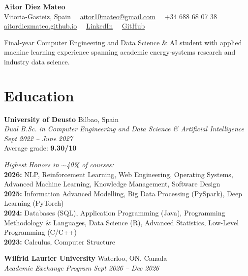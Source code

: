 \documentclass[10pt,a4paper]{article}
\newcommand{\cvheader}[2]{\textbf{#1} \hfill #2\\}
\newcommand{\cvsubheader}[2]{\textit{#1} \hfill \textit{#2}\\[-10pt]}
\begin{document}
\begin{center}
{\Huge \textbf{Aitor Diez Mateo}}\\[5pt]
{\small Vitoria-Gasteiz, Spain \ \textbullet\ \href{mailto:aitor10mateo@gmail.com}{aitor10mateo@gmail.com} \ \textbullet\ +34 688 68 07 38}\\[2pt]
{\small 
\href{https://aitordiezmateo.github.io}{aitordiezmateo.github.io} \ 
\textbullet\ \href{https://www.linkedin.com/in/aitordiezmateo}{LinkedIn} \ \textbullet\ \href{https://github.com/aitorDiezMateo}{GitHub}
}
\end{center}

\vspace{3pt}

\noindent Final-year Computer Engineering and Data Science \& AI student with applied machine learning experience spanning academic energy-systems research and industry data science.

\section{Education}

\cvheader{University of Deusto}{Bilbao, Spain}
\textit{Dual B.Sc. in Computer Engineering and Data Science \& Artificial Intelligence} \hfill \textit{Sept 2022 -- June 2027}\\[4pt] 
\noindent Average grade: \textbf{9.30/10}

\vspace{3pt}
\textit{Highest Honors in $\sim$40\% of courses:}\\[1pt]
\textbf{2026:} NLP, Reinforcement Learning, Web Engineering, Operating Systems, Advanced Machine Learning, Knowledge Management, Software Design\\
\textbf{2025:} Information Advanced Modelling, Big Data Processing (PySpark), Deep Learning (PyTorch)\\
\textbf{2024:} Databases (SQL), Application Programming (Java), Programming Methodology \& Languages, Data Science (R), Advanced Statistics, Low-Level Programming (C/C++)\\
\textbf{2023:} Calculus, Computer Structure

\vspace{2pt}
\cvheader{Wilfrid Laurier University}{Waterloo, ON, Canada}
\cvsubheader{Academic Exchange Program}{Sept 2026 -- Dec 2026}
\end{document}

